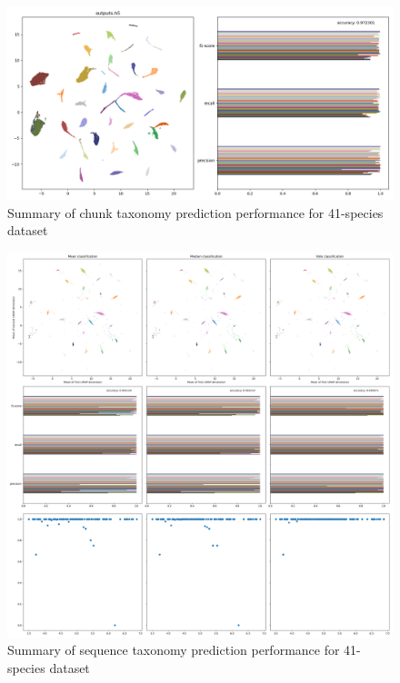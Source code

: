 \documentclass{article}
\begin{document}
\begin{figure}
  \includegraphics[width=\linewidth]{new_journal/figures/ar122_r89.genomic.medium/chunks_W4000_S4000/roznet/o256_g4_b32_lr0.001_16bit_A4/summary.png}
  \caption{Summary of chunk taxonomy prediction performance for 41-species dataset}
  \label{fig:summary_roznet_medium_training}
\end{figure}

\begin{figure}
  \includegraphics[width=\linewidth]{new_journal/figures/ar122_r89.genomic.medium/chunks_W4000_S4000/roznet/o256_g4_b32_lr0.001_16bit_A4/summary.aggregated.png}
  \caption{Summary of sequence taxonomy prediction performance for 41-species dataset}
  \label{fig:summary_aggregated_roznet_medium_training}
\end{figure}
\end{document}
